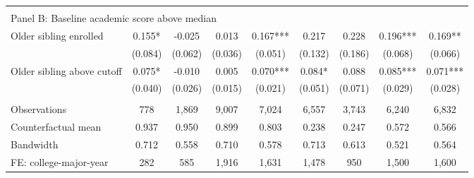 {{\begin{tabular}{lcccccccc}
&  &  &  & & & & & &    \\
\multicolumn{9}{l}{Panel B: Baseline academic score above median} \\
Older sibling enrolled&       0.155*  &      -0.025   &       0.013   &       0.167***&       0.217   &       0.228   &       0.196***&       0.169** \\
                    &     (0.084)   &     (0.062)   &     (0.036)   &     (0.051)   &     (0.132)   &     (0.186)   &     (0.068)   &     (0.066)   \\
 
Older sibling above cutoff&       0.075*  &      -0.010   &       0.005   &       0.070***&       0.084*  &       0.088   &       0.085***&       0.071***\\
                    &     (0.040)   &     (0.026)   &     (0.015)   &     (0.021)   &     (0.051)   &     (0.071)   &     (0.029)   &     (0.028)   \\
                    &               &               &               &               &               &               &               &               \\
Observations        &         778   &       1,869   &       9,007   &       7,024   &       6,557   &       3,743   &       6,240   &       6,832   \\
Counterfactual mean &       0.937   &       0.950   &       0.899   &       0.803   &       0.238   &       0.247   &       0.572   &       0.566   \\
Bandwidth           &       0.712   &       0.558   &       0.710   &       0.578   &       0.713   &       0.613   &       0.521   &       0.564   \\
FE: college-major-year&         282   &         585   &       1,916   &       1,631   &       1,478   &         950   &       1,500   &       1,600   \\
 

\bottomrule
\end{tabular}
}
}
